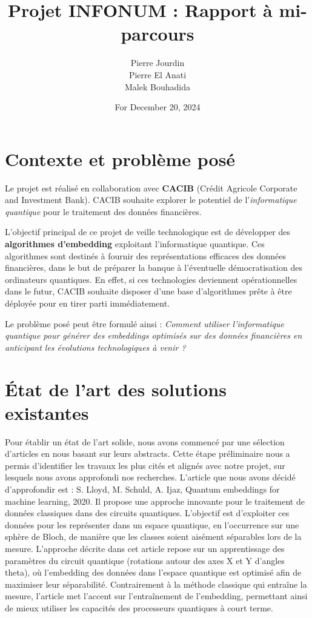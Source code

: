 \documentclass[11pt,a4paper]{article}
\title{\textbf{Projet INFONUM : Rapport à mi-parcours}}
\author{Pierre Jourdin \\
        Pierre El Anati \\
        Malek Bouhadida}
\date{For December 20, 2024}
\begin{document}
\maketitle
\tableofcontents
\newpage

\section{Contexte et problème posé}

Le projet est réalisé en collaboration avec \textbf{CACIB} (Crédit Agricole Corporate and Investment Bank). CACIB souhaite explorer le potentiel de l'\textit{informatique quantique} pour le traitement des données financières.

L'objectif principal de ce projet de veille technologique est de développer des \textbf{algorithmes d'embedding} exploitant l'informatique quantique. Ces algorithmes sont destinés à fournir des représentations efficaces des données financières, dans le but de préparer la banque à l'éventuelle démocratisation des ordinateurs quantiques. En effet, si ces technologies deviennent opérationnelles dans le futur, CACIB souhaite disposer d'une base d'algorithmes prête à être déployée pour en tirer parti immédiatement.

Le problème posé peut être formulé ainsi : \textit{Comment utiliser l'informatique quantique pour générer des embeddings optimisés sur des données financières en anticipant les évolutions technologiques à venir ?}


\section{État de l'art des solutions existantes}
Pour établir un état de l’art solide, nous avons commencé par une sélection d’articles en nous basant sur leurs abstracts. Cette étape préliminaire nous a permis d’identifier les travaux les plus cités et alignés avec notre projet, sur lesquels nous avons approfondi nos recherches.
L’article que nous avons décidé d’approfondir est : S. Lloyd, M. Schuld, A. Ijaz, Quantum embeddings for machine learning, 2020. Il propose une approche innovante pour le traitement de données classiques dans des circuits quantiques. L’objectif est d’exploiter ces données pour les représenter dans un espace quantique, en l’occurrence sur une sphère de Bloch, de manière que les classes soient aisément séparables lors de la mesure.
L’approche décrite dans cet article repose sur un apprentissage des paramètres du circuit quantique (rotations autour des axes X et Y d’angles theta), où l’embedding des données dans l’espace quantique est optimisé afin de maximiser leur séparabilité. Contrairement à la méthode classique qui entraîne la mesure, l’article met l’accent sur l’entraînement de l’embedding, permettant ainsi de mieux utiliser les capacités des processeurs quantiques à court terme.
\end{document}
